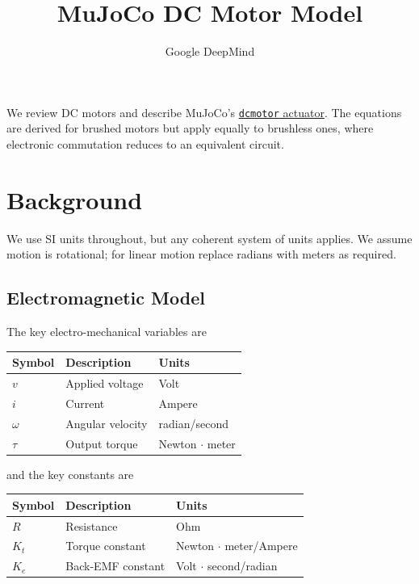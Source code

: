 \documentclass[10pt, a4paper, twocolumn]{article}
\title{MuJoCo DC Motor Model}
\author{Google DeepMind}
\date{}
\let\oldtexttt\texttt
\renewcommand{\texttt}[1]{{\smaller\oldtexttt{#1}}}
\begin{document}
\maketitle

\noindent We review DC motors and describe MuJoCo's \href{https://mujoco.readthedocs.io/en/stable/XMLreference.html#actuator-dcmotor}{\texttt{dcmotor} actuator}. The equations are derived for brushed motors but apply equally to brushless ones, where electronic commutation reduces to an equivalent circuit.

\section{Background}
\label{sec:background}

We use SI units throughout, but any coherent system of units applies. We assume motion is rotational; for linear motion replace radians with meters as required.

\subsection{Electromagnetic Model}
\label{sec:electromagnetics}

The key electro-mechanical variables are

\begin{table}[H]
\centering
\small
\begin{tabular}{@{}lll@{}}
\toprule
Symbol & Description & Units \\
\midrule
$v$ & Applied voltage & Volt \\
$i$ & Current & Ampere \\
$\omega$ & Angular velocity & radian/second \\
$\tau$ & Output torque & Newton $\cdot$ meter \\
\bottomrule
\end{tabular}
\end{table}

\noindent and the key constants are

\begin{table}[H]
\centering
\footnotesize
\begin{tabular}{@{}lll@{}}
\toprule
Symbol & Description & Units \\
\midrule
$R$ & Resistance & Ohm \\
$K_t$ & Torque constant & Newton $\cdot$ meter/Ampere \\
$K_e$ & Back-EMF constant & Volt $\cdot$ second/radian \\
\bottomrule
\end{tabular}
\end{table}
\end{document}

